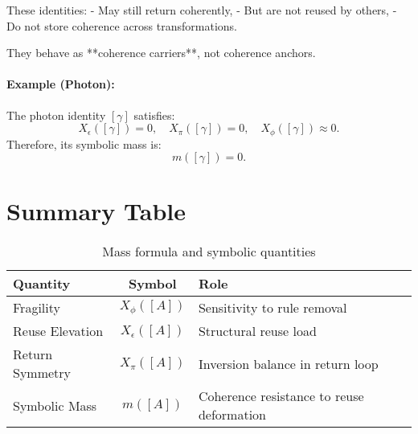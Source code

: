 These identities:
- May still return coherently,
- But are not reused by others,
- Do not store coherence across transformations.

They behave as **coherence carriers**, not coherence anchors.

\paragraph{Example (Photon):}
The photon identity $[\gamma]$ satisfies:
\[
X_\epsilon([\gamma]) = 0, \quad X_\pi([\gamma]) = 0, \quad X_\phi([\gamma]) \approx 0.
\]
Therefore, its symbolic mass is:
\[
m([\gamma]) = 0.
\]
\section{Summary Table}

\begin{table}[h!]
\centering
\begin{tabular}{|l|c|l|}
\hline
\textbf{Quantity} & \textbf{Symbol} & \textbf{Role} \\
\hline
Fragility & $X_\phi([A])$ & Sensitivity to rule removal \\
Reuse Elevation & $X_\epsilon([A])$ & Structural reuse load \\
Return Symmetry & $X_\pi([A])$ & Inversion balance in return loop \\
Symbolic Mass & $m([A])$ & Coherence resistance to reuse deformation \\
\hline
\end{tabular}
\caption{Mass formula and symbolic quantities}
\end{table}

